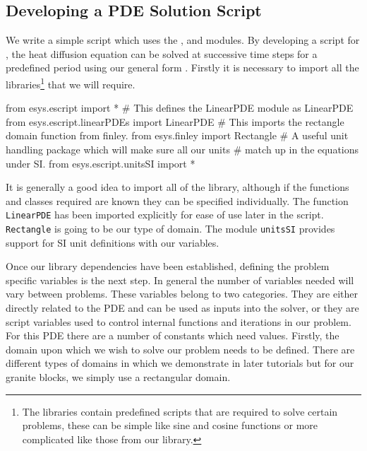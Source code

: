 \subsection{Developing a PDE Solution Script}
\label{sec:key}
We write a simple \pyt script which uses the \modescript, \modfinley and \modmpl
modules. 
By developing a script for \esc, the heat diffusion equation can be solved at
successive time steps for a predefined period using our general form
. Firstly it is necessary to import all the
libraries\footnote{The libraries contain predefined scripts that are required to
solve certain problems, these can be simple like sine and cosine functions or
more complicated like those from our \esc library.} 
that we will require.
\begin{python}
from esys.escript import *
# This defines the LinearPDE module as LinearPDE
from esys.escript.linearPDEs import LinearPDE 
# This imports the rectangle domain function from finley.
from esys.finley import Rectangle 
# A useful unit handling package which will make sure all our units
# match up in the equations under SI.
from esys.escript.unitsSI import * 
\end{python}
It is generally a good idea to import all of the \modescript library, although
if the functions and classes required are known they can be specified
individually. The function \verb|LinearPDE| has been imported explicitly for
ease of use later in the script. \verb|Rectangle| is going to be our type of
domain. The module \verb|unitsSI| provides support for SI unit definitions with
our variables.

Once our library dependencies have been established, defining the problem
specific variables is the next step. In general the number of variables needed
will vary between problems. These variables belong to two categories. They are
either directly related to the PDE and can be used as inputs into the \esc
solver, or they are script variables used to control internal functions and
iterations in our problem. For this PDE there are a number of constants which
need values. Firstly, the domain upon which we wish to solve our problem needs
to be defined. There are different types of domains in \modescript which we
demonstrate in later tutorials but for our granite blocks, we simply use a
rectangular domain. 

